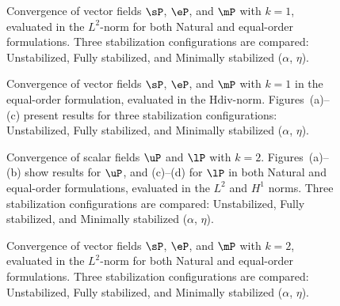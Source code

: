 \begin{figure}[h!]
	\centering
	\caption{Convergence of vector fields $\sP$, $\eP$, and $\mP$ with $k=1$, evaluated in the $L^{2}$-norm for both Natural and equal-order formulations. Three stabilization configurations are compared: Unstabilized, Fully stabilized, and Minimally stabilized ($\alpha$, $\eta$).}
	\def\svgwidth{1.0\columnwidth}
	
	\label{fig:convergence_vector_quadratic}
\end{figure}

\begin{figure}[h!]
	\centering
	\caption{Convergence of vector fields $\sP$, $\eP$, and $\mP$ with $k=1$ in the equal-order formulation, evaluated in the $\text{Hdiv}$-norm. Figures~(a)--(c) present results for three stabilization configurations: Unstabilized, Fully stabilized, and Minimally stabilized ($\alpha$, $\eta$).}
	\def\svgwidth{1.0\columnwidth}
	
	\label{fig:convergence_vector_quadratic_hdiv}
\end{figure}




\begin{figure}[h!]
	\centering
	\caption{Convergence of scalar fields $\uP$ and $\lP$ with $k=2$. Figures~(a)--(b) show results for $\uP$, and (c)--(d) for $\lP$ in both Natural and equal-order formulations, evaluated in the $L^{2}$ and $H^{1}$ norms.   Three stabilization configurations are compared: Unstabilized, Fully stabilized, and Minimally stabilized ($\alpha$, $\eta$).}
	\def\svgwidth{1.0\columnwidth}
	
	\label{fig:convergence_scalar_cubic}
\end{figure}



\begin{figure}[h!]
	\centering
	\caption{Convergence of vector fields $\sP$, $\eP$, and $\mP$ with $k=2$, evaluated in the $L^{2}$-norm for both Natural and equal-order formulations. Three stabilization configurations are compared: Unstabilized, Fully stabilized, and Minimally stabilized ($\alpha$, $\eta$).}
	\def\svgwidth{1.0\columnwidth}
	
	\label{fig:convergence_vector_cubic}
\end{figure}


